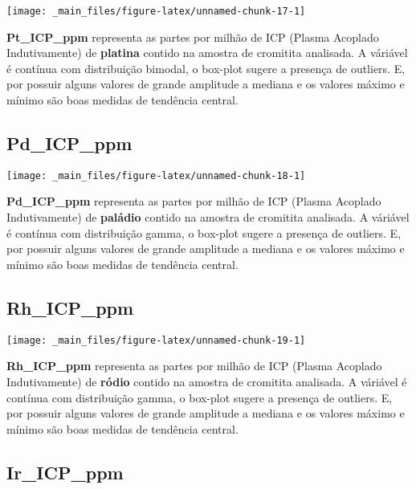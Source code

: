 \documentclass[
]{article}
\begin{document}
\begin{center}\texttt{[image: \_main\_files/figure-latex/unnamed-chunk-17-1]} \end{center}

\textbf{Pt\_ICP\_ppm} representa as partes por milhão de ICP (Plasma Acoplado Indutivamente) de \textbf{platina} contido na amostra de cromitita analisada. A váriável é contínua com distribuição bimodal, o box-plot sugere a presença de outliers. E, por possuir alguns valores de grande amplitude a mediana e os valores máximo e mínimo são boas medidas de tendência central.

\hypertarget{pd_icp_ppm}{%
\subsection{Pd\_ICP\_ppm}\label{pd_icp_ppm}}

\begin{center}\texttt{[image: \_main\_files/figure-latex/unnamed-chunk-18-1]} \end{center}

\textbf{Pd\_ICP\_ppm} representa as partes por milhão de ICP (Plasma Acoplado Indutivamente) de \textbf{paládio} contido na amostra de cromitita analisada. A váriável é contínua com distribuição gamma, o box-plot sugere a presença de outliers. E, por possuir alguns valores de grande amplitude a mediana e os valores máximo e mínimo são boas medidas de tendência central.

\hypertarget{rh_icp_ppm}{%
\subsection{Rh\_ICP\_ppm}\label{rh_icp_ppm}}

\begin{center}\texttt{[image: \_main\_files/figure-latex/unnamed-chunk-19-1]} \end{center}

\textbf{Rh\_ICP\_ppm} representa as partes por milhão de ICP (Plasma Acoplado Indutivamente) de \textbf{ródio} contido na amostra de cromitita analisada. A váriável é contínua com distribuição gamma, o box-plot sugere a presença de outliers. E, por possuir alguns valores de grande amplitude a mediana e os valores máximo e mínimo são boas medidas de tendência central.

\hypertarget{ir_icp_ppm}{%
\subsection{Ir\_ICP\_ppm}\label{ir_icp_ppm}}
\end{document}
